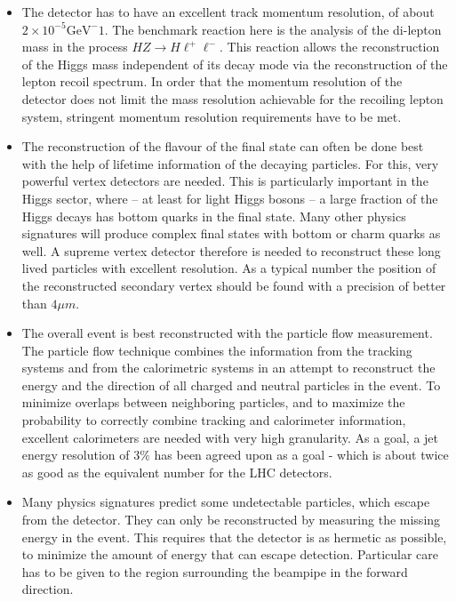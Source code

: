 \documentclass[%
 reprint,
 amsmath,amssymb,
 aps,
]{revtex4-1}
\begin{document}
 
\begin{itemize}
 \item The detector has to have an excellent track momentum
   resolution, of about $2 \times 10^{-5} \mathrm{GeV}^-1$. The benchmark reaction here is the analysis 
of the di-lepton mass in the process $HZ \to H \ell^+
\ell^-$. This reaction allows the reconstruction of the 
Higgs mass independent of its decay mode via the 
reconstruction of the lepton recoil spectrum. In order that 
the momentum resolution of the detector does not limit 
the mass resolution achievable for the recoiling lepton 
system, stringent momentum resolution requirements have to be met. 
\item The reconstruction of the flavour of the final state can 
often be done best with the help of lifetime information of the 
decaying particles. For this, very powerful vertex detectors 
are needed. This is particularly important 
in the Higgs sector, where -- at least for light Higgs bosons -- 
a large fraction of the Higgs decays has bottom 
quarks in the final state. Many other physics signatures will 
produce complex final states with bottom or charm quarks as well. 
A supreme vertex detector therefore is needed to reconstruct these 
long lived particles with excellent resolution. As a typical number the position of the reconstructed secondary vertex should be found with a precision of better than $4 \mu m$. 
\item The overall event is best reconstructed with the 
particle flow measurement. The particle flow technique combines 
the information from the tracking systems and from the 
calorimetric systems in an attempt to reconstruct the 
energy and the direction of all charged and 
neutral particles in the event. To minimize overlaps between 
neighboring particles, and to maximize the probability to 
correctly combine tracking and calorimeter information, 
excellent calorimeters are needed with very high granularity. As a goal, a jet energy resolution of $3 \%$ has been agreed upon as a goal - which is about twice as good as the equivalent number for the LHC detectors. 
\item Many physics signatures predict some undetectable particles, 
which escape from the detector. They can only be reconstructed by 
measuring the missing energy in the event. This requires 
that the detector is as hermetic as possible, to 
minimize the amount of energy that can escape detection. 
Particular care has to be given to the region surrounding the 
beampipe in the forward direction. 
\end{itemize}
\end{document}
